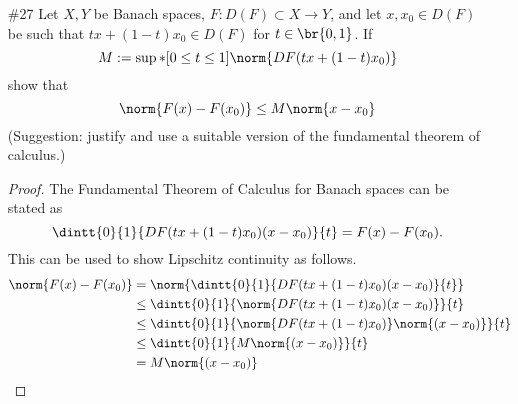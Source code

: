 \documentclass[11pt, oneside]{article}
\begin{document}
\begin{enumerate}
  \pagebreak
  \item[\#27]
    Let $X, Y$ be Banach spaces, $F: D(F) \subset X \to Y$, and let
    $x, x_0 \in D(F)$ be such that $tx + (1 - t)x_0 \in D(F)$ for
    $t \in \br{0, 1}$.
    If
    \[
      M := \sup*[0 \le t \le 1]{\norm{DF(tx + (1 - t)x_0)}}
    \]
    show that
    \[
      \norm{F(x) - F(x_0)} \le M\norm{x - x_0}
    \]
    (Suggestion: justify and use a suitable version of the fundamental theorem
    of calculus.)

    \begin{proof}
      The Fundamental Theorem of Calculus for Banach spaces can be stated as
      \[
        \dintt{0}{1}{DF(tx + (1 - t)x_0)(x - x_0)}{t} = F(x) - F(x_0).
      \]
      This can be used to show Lipschitz continuity as follows.
      \begin{align*}
        \norm{F(x) - F(x_0)} &= \norm{\dintt{0}{1}{DF(tx + (1 - t)x_0)(x - x_0)}{t}} \\
        &\le \dintt{0}{1}{\norm{DF(tx + (1 - t)x_0)(x - x_0)}}{t} \\
        &\le \dintt{0}{1}{\norm{DF(tx + (1 - t)x_0)}\norm{(x - x_0)}}{t} \\
        &\le \dintt{0}{1}{M\norm{(x - x_0)}}{t} \\
        &= M\norm{(x - x_0)} \\
      \end{align*}
    \end{proof}
\end{enumerate}

\pagebreak
\end{document}
